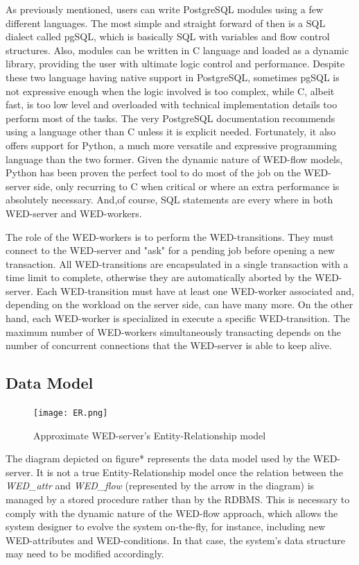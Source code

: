 \documentclass[conference]{IEEEtran}
\begin{document}
\par As previously mentioned, users can write PostgreSQL modules using a few different languages. The most simple and straight
forward of then is a SQL dialect called pgSQL, which is basically SQL with variables and flow control structures. Also, modules
can be written in C language and loaded as a dynamic library, providing the user with ultimate logic control and performance.
Despite these two language having native support in PostgreSQL, sometimes pgSQL is not expressive enough when the logic
involved is too complex, while C, albeit fast, is too low level and overloaded with technical implementation details too
perform most of the tasks. The very PostgreSQL documentation recommends using a language other than C unless it is explicit
needed. Fortunately, it also offers support for Python, a much more versatile and expressive programming language than
the two former. Given the dynamic nature of WED-flow models, Python has been proven the perfect tool to do most of the job
on the WED-server side, only recurring to C when critical or where an extra performance is absolutely necessary. And,of
course, SQL statements are every where in both WED-server and WED-workers. 

\par The role of the WED-workers is to perform the WED-transitions. They must connect to the WED-server and "ask" for a pending
job before opening a new transaction. All WED-transitions are encapsulated in a single transaction with a time limit to 
complete, otherwise they are automatically aborted by the WED-server. Each WED-transition must have at least one WED-worker
associated and, depending on the workload on the server side, can have many more. On the other hand, each WED-worker is 
specialized in execute a specific WED-transition. The maximum number of WED-workers simultaneously transacting depends 
on the number of concurrent connections that the WED-server is able to keep alive.

\subsection{Data Model}

\begin{figure}[!t]
\centering
\texttt{[image: ER.png]}
\caption{Approximate WED-server's Entity-Relationship model}
\label{fig_er}

\end{figure}
 The diagram depicted on figure* represents the data model used by the WED-server. It is not a true Entity-Relationship 
model once the relation between the \emph{WED\_attr} and \emph{WED\_flow} (represented by the arrow in the diagram) is 
managed by a stored procedure rather than by the RDBMS. This is necessary to comply with the dynamic nature of the WED-flow 
approach, which allows the system designer to evolve the system on-the-fly, for instance, including new WED-attributes and 
WED-conditions. In that case, the system's data structure may need to be modified accordingly. 
\end{document}

